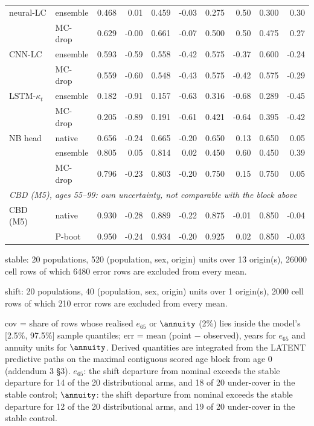 \begin{table}[tbp]
\begin{threeparttable}
\begin{tabular}{@{}llrrrrrrrr@{}}
neural-LC & ensemble & 0.468 & 0.01 & 0.459 & -0.03 & 0.275 & 0.50 & 0.300 & 0.30 \\
 & MC-drop & 0.629 & -0.00 & 0.661 & -0.07 & 0.500 & 0.50 & 0.475 & 0.27 \\
CNN-LC & ensemble & 0.593 & -0.59 & 0.558 & -0.42 & 0.575 & -0.37 & 0.600 & -0.24 \\
 & MC-drop & 0.559 & -0.60 & 0.548 & -0.43 & 0.575 & -0.42 & 0.575 & -0.29 \\
LSTM-$\kappa_t$ & ensemble & 0.182 & -0.91 & 0.157 & -0.63 & 0.316 & -0.68 & 0.289 & -0.45 \\
 & MC-drop & 0.205 & -0.89 & 0.191 & -0.61 & 0.421 & -0.64 & 0.395 & -0.42 \\
NB head & native & 0.656 & -0.24 & 0.665 & -0.20 & 0.650 & 0.13 & 0.650 & 0.05 \\
 & ensemble & 0.805 & 0.05 & 0.814 & 0.02 & 0.450 & 0.60 & 0.450 & 0.39 \\
 & MC-drop & 0.796 & -0.23 & 0.803 & -0.20 & 0.750 & 0.15 & 0.750 & 0.05 \\
\multicolumn{10}{l}{\emph{CBD (M5), ages 55--99: own uncertainty, not comparable with the block above}} \\
\midrule
CBD (M5) & native & 0.930 & -0.28 & 0.889 & -0.22 & 0.875 & -0.01 & 0.850 & -0.04 \\
 & P-boot & 0.950 & -0.24 & 0.934 & -0.20 & 0.925 & 0.02 & 0.850 & -0.03 \\
\bottomrule
\end{tabular}
\begin{tablenotes}\scriptsize
\item stable: 20 populations, 520 (population, sex, origin) units over 13 origin(s), 26000 cell rows of which 6480 error rows are excluded from every mean.
\item shift: 20 populations, 40 (population, sex, origin) units over 1 origin(s), 2000 cell rows of which 210 error rows are excluded from every mean.
\item cov = share of rows whose realised $e_{65}$ or $\annuity$ (2\%) lies inside the model's [2.5\%, 97.5\%] sample quantiles; err = mean (point $-$ observed), years for $e_{65}$ and annuity units for $\annuity$. Derived quantities are integrated from the LATENT predictive paths on the maximal contiguous scored age block from age 0 (addendum 3 \S3). $e_{65}$: the shift departure from nominal exceeds the stable departure for 14 of the 20 distributional arms, and 18 of 20 under-cover in the stable control; $\annuity$: the shift departure from nominal exceeds the stable departure for 12 of the 20 distributional arms, and 19 of 20 under-cover in the stable control.

\end{tablenotes}
\end{threeparttable}
\end{table}
